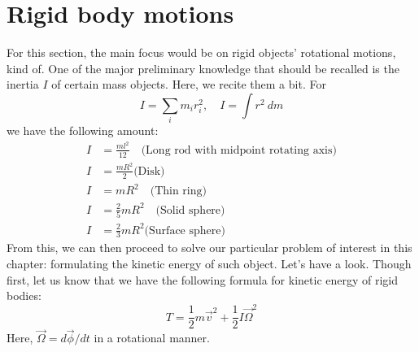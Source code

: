 \section{Rigid body motions}
For this section, the main focus would be on rigid objects' rotational motions, kind of. One of the major preliminary knowledge that should be recalled is the inertia $I$ of certain mass objects. Here, we recite them a bit. For 
\begin{equation}
    I = \sum_{i} m_{i}r_{i}^{2}, \quad I = \int r^{2}\:dm
\end{equation}
we have the following amount:
\begin{align}
    I & = \frac{ml^{2}}{12}\quad \text{(Long rod with midpoint rotating axis)}\\
    I & = \frac{mR^{2}}{2} \text{(Disk)}\\
    I & = mR^{2}\quad \text{(Thin ring)}\\
    I & = \frac{2}{5} mR^{2}\quad \text{(Solid sphere)}\\
    I & = \frac{2}{3} mR^{2} \text{(Surface sphere)}
\end{align}
From this, we can then proceed to solve our particular problem of interest in this chapter: formulating the kinetic energy of such object. Let's have a look. Though first, let us know that we have the following formula for kinetic energy of rigid bodies: 
\begin{equation}
    T = \frac{1}{2}m \vec{v}^{2} + \frac{1}{2} I \vec{\Omega}^{2}
\end{equation}
Here, $\vec{\Omega}=d\vec{\phi}/dt$ in a rotational manner. 
